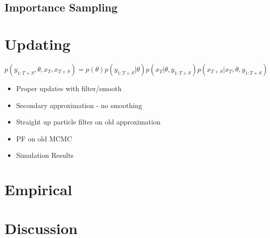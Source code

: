 \documentclass[12pt,a4paper]{article}%
\numberwithin{equation}{section}
\begin{document}
\subsection{Importance Sampling}

\citep{Sakaya2017}


\section{Updating}

$$p(y_{1:T+S}, \theta, x_T, x_{T+S}) = p(\theta) p(y_{1:T+S} | \theta) p (x_T | \theta, y_{1:T+S}) p(x_{T+S} | x_T, \theta, y_{1:T+S})$$

\begin{itemize}
\item Proper updates with filter/smooth
\item Secondary approximation - no smoothing
\item Straight up particle filter on old approximation
\item PF on old MCMC
\item Simulation Results
\end{itemize}

\section{Empirical}

\section{Discussion}



 
\end{document}
